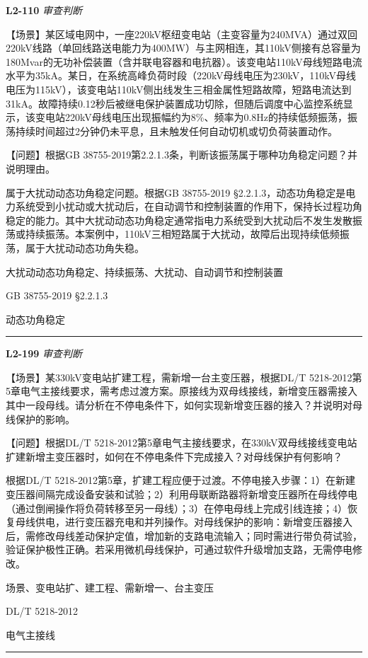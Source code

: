 \documentclass[12pt,a4paper]{ctexart}
\begin{document}
\noindent\textbf{L2-110} \hfill \textit{审查判断}
\begin{description}[leftmargin=1.5em,style=nextline,font=\normalfont]
  \item[Q:] 【场景】某区域电网中，一座220kV枢纽变电站（主变容量为240MVA）通过双回220kV线路（单回线路送电能力为400MW）与主网相连，其110kV侧接有总容量为180Mvar的无功补偿装置（含并联电容器和电抗器）。该变电站110kV母线短路电流水平为35kA。某日，在系统高峰负荷时段（220kV母线电压为230kV，110kV母线电压为115kV），该变电站110kV侧出线发生三相金属性短路故障，短路电流达到31kA。故障持续0.12秒后被继电保护装置成功切除，但随后调度中心监控系统显示，该变电站220kV母线电压出现振幅约为8\%、频率为0.8Hz的持续低频振荡，振荡持续时间超过2分钟仍未平息，且未触发任何自动切机或切负荷装置动作。

【问题】根据GB 38755-2019第2.2.1.3条，判断该振荡属于哪种功角稳定问题？并说明理由。
  \item[A:] 属于大扰动动态功角稳定问题。根据GB 38755-2019 §2.2.1.3，动态功角稳定是电力系统受到小扰动或大扰动后，在自动调节和控制装置的作用下，保持长过程功角稳定的能力。其中大扰动动态功角稳定通常指电力系统受到大扰动后不发生发散振荡或持续振荡。本案例中，110kV三相短路属于大扰动，故障后出现持续低频振荡，属于大扰动动态功角失稳。
  \item[KW:] 大扰动动态功角稳定、持续振荡、大扰动、自动调节和控制装置
  \item[Std:] GB 38755-2019 §2.2.1.3
  \item[Topic:] 动态功角稳定
\end{description}
\vspace{4pt}
\hrule\vspace{6pt}

\noindent\textbf{L2-199} \hfill \textit{审查判断}
\begin{description}[leftmargin=1.5em,style=nextline,font=\normalfont]
  \item[Q:] 【场景】某330kV变电站扩建工程，需新增一台主变压器，根据DL/T 5218-2012第5章电气主接线要求，需考虑过渡方案。原接线为双母线接线，新增变压器需接入其中一段母线。请分析在不停电条件下，如何实现新增变压器的接入？并说明对母线保护的影响。

【问题】根据DL/T 5218-2012第5章电气主接线要求，在330kV双母线接线变电站扩建新增主变压器时，如何在不停电条件下完成接入？对母线保护有何影响？
  \item[A:] 根据DL/T 5218-2012第5章，扩建工程应便于过渡。不停电接入步骤：1）在新建变压器间隔完成设备安装和试验；2）利用母联断路器将新增变压器所在母线停电（通过倒闸操作将负荷转移至另一母线）；3）在停电母线上完成引线连接；4）恢复母线供电，进行变压器充电和并列操作。对母线保护的影响：新增变压器接入后，需修改母线差动保护定值，增加新的支路电流输入；同时需进行带负荷试验，验证保护极性正确。若采用微机母线保护，可通过软件升级增加支路，无需停电修改。
  \item[KW:] 场景、变电站扩、建工程、需新增一、台主变压
  \item[Std:] DL/T 5218-2012
  \item[Topic:] 电气主接线
\end{description}
\vspace{4pt}
\hrule\vspace{6pt}
\end{document}
